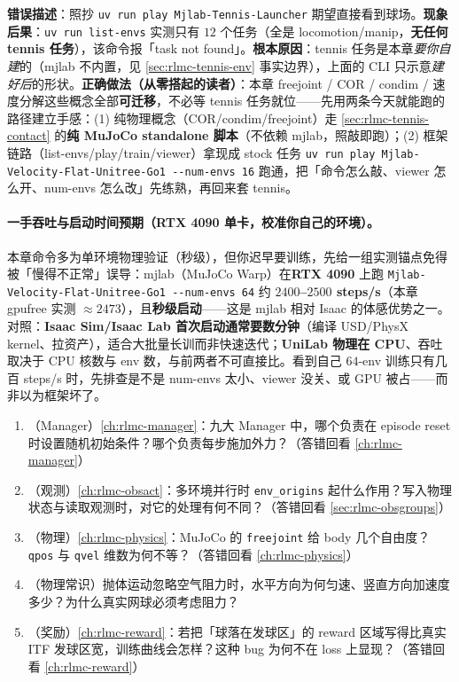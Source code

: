 \begin{pitfall}
\textbf{错误描述}：照抄 \verb|uv run play Mjlab-Tennis-Launcher| 期望直接看到球场。\textbf{现象后果}：\verb|uv run list-envs| 实测只有 $12$ 个任务（全是 locomotion/manip，\textbf{无任何 tennis 任务}），该命令报「task not found」。\textbf{根本原因}：tennis 任务是本章\emph{要你自建}的（mjlab 不内置，见 \cref{sec:rlmc-tennis-env} 事实边界），上面的 CLI 只示意\emph{建好后}的形状。\textbf{正确做法（从零搭起的读者）}：本章 freejoint / COR / condim / 速度分解这些概念全部\textbf{可迁移}，不必等 tennis 任务就位——先用两条今天就能跑的路径建立手感：(1) 纯物理概念（COR/condim/freejoint）走 \cref{sec:rlmc-tennis-contact} 的\textbf{纯 MuJoCo standalone 脚本}（不依赖 mjlab，照敲即跑）；(2) 框架链路（list-envs/play/train/viewer）拿现成 stock 任务 \verb|uv run play Mjlab-Velocity-Flat-Unitree-Go1 --num-envs 16| 跑通，把「命令怎么敲、viewer 怎么开、num-envs 怎么改」先练熟，再回来套 tennis。
\end{pitfall}

\paragraph{一手吞吐与启动时间预期（RTX 4090 单卡，校准你自己的环境）。}本章命令多为单环境物理验证（秒级），但你迟早要训练，先给一组实测锚点免得被「慢得不正常」误导：mjlab（MuJoCo Warp）在\textbf{RTX 4090} 上跑 \verb|Mjlab-Velocity-Flat-Unitree-Go1 --num-envs 64| 约 \textbf{$2400$--$2500$ steps/s}（本章 gpufree 实测 $\approx2473$），且\textbf{秒级启动}——这是 mjlab 相对 Isaac 的体感优势之一。对照：\textbf{Isaac Sim/Isaac Lab 首次启动通常要数分钟}（编译 USD/PhysX kernel、拉资产），适合大批量长训而非快速迭代；\textbf{UniLab 物理在 CPU}、吞吐取决于 CPU 核数与 env 数，与前两者不可直接比。看到自己 $64$-env 训练只有几百 steps/s 时，先排查是不是 num-envs 太小、viewer 没关、或 GPU 被占——而非以为框架坏了。

\begin{practice}
\begin{enumerate}
  \item （Manager）\cref{ch:rlmc-manager}：九大 Manager 中，哪个负责在 episode reset 时设置随机初始条件？哪个负责每步施加外力？（答错回看 \cref{ch:rlmc-manager}）
  \item （观测）\cref{ch:rlmc-obsact}：多环境并行时 \verb|env_origins| 起什么作用？写入物理状态与读取观测时，对它的处理有何不同？（答错回看 \cref{sec:rlmc-obsgroups}）
  \item （物理）\cref{ch:rlmc-physics}：MuJoCo 的 \verb|freejoint| 给 body 几个自由度？\verb|qpos| 与 \verb|qvel| 维数为何不等？（答错回看 \cref{ch:rlmc-physics}）
  \item （物理常识）抛体运动忽略空气阻力时，水平方向为何匀速、竖直方向加速度多少？为什么真实网球必须考虑阻力？
  \item （奖励）\cref{ch:rlmc-reward}：若把「球落在发球区」的 reward 区域写得比真实 ITF 发球区宽，训练曲线会怎样？这种 bug 为何不在 loss 上显现？（答错回看 \cref{ch:rlmc-reward}）
\end{enumerate}
\end{practice}

